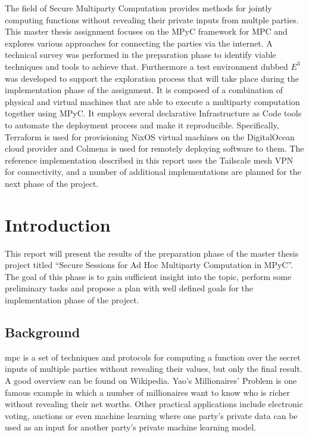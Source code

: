 \documentclass[
]{article}
\author{}
\date{}
\begin{document}
The field of Secure Multiparty Computation provides methods for jointly
computing functions without revealing their private inputs from multple
parties. This master thesis assignment focuses on the MPyC framework for
MPC and explores various approaches for connecting the parties via the
internet. A technical survey was performed in the preparation phase to
identify viable techniques and tools to achieve that. Furthermore a test
environment dubbed \(E^3\) was developed to support the exploration
process that will take place during the implementation phase of the
assignment. It is composed of a combination of physical and virtual
machines that are able to execute a multiparty computation together
using MPyC. It employs several declarative Infrastructure as Code tools
to automate the deployment process and make it reproducible.
Specifically, Terraform is used for provisioning NixOS virtual machines
on the DigitalOcean cloud provider and Colmena is used for remotely
deploying software to them. The reference implementation described in
this report uses the Tailscale mesh VPN for connectivity, and a number
of additional implementations are planned for the next phase of the
project.

\hypertarget{introduction}{%
  \section{Introduction}\label{introduction}}

This report will present the results of the preparation phase of the
master thesis project titled ``Secure Sessions for Ad Hoc Multiparty
Computation in MPyC''. The goal of this phase is to gain sufficient
insight into the topic, perform some preliminary tasks and propose a
plan with well defined goals for the implementation phase of the
project.

\hypertarget{background}{%
  \subsection{Background}\label{background}}

\gls{mpc} is a set of techniques and protocols for computing a function
over the secret inputs of multiple parties without revealing their
values, but only the final result. A good overview can be found on
Wikipedia\autocite{wikiMPC}. Yao's Millionaires'
Problem\autocite{yaoProtocolsSecureComputations1982} is one famous
example in which a number of millionaires want to know who is richer
without revealing their net worths. Other practical
applications\autocite{laudApplicationsSecureMultiparty2015} include
electronic voting, auctions or even machine
learning\autocite{knottCrypTenSecureMultiParty2022} where one party's
private data can be used as an input for another party's private machine
learning model.
\end{document}
